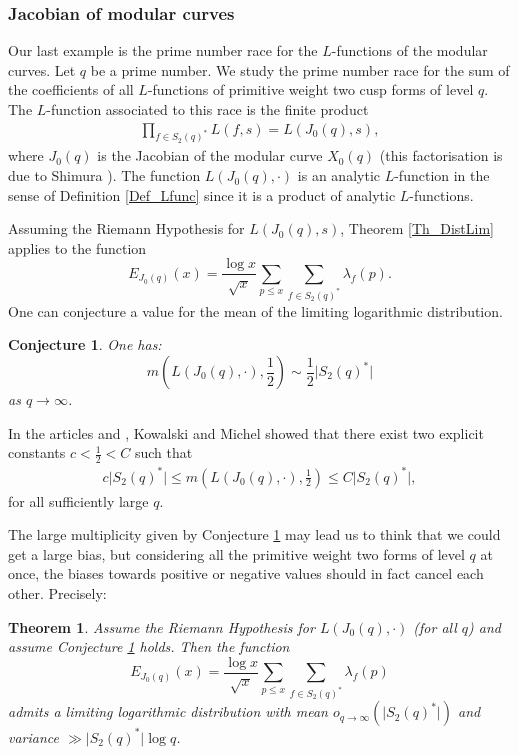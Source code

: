 \documentclass[a4paper,10pt]{amsart}
\theoremstyle{plain}
\newtheorem{conj}{Conjecture}
\newtheorem{theo}{Theorem}[section]
\theoremstyle{definition}
\begin{document}
\subsubsection{Jacobian of modular curves}

Our last example is the prime number race for the $L$-functions of the modular curves.
Let $q$ be a prime number.
We study the prime number race for the sum of the coefficients of all $L$-functions of primitive weight two cusp forms of level $q$.
The $L$-function associated to this race is the finite product
\begin{align*}
\prod_{f\in S_{2}(q)^{*}}L(f,s) = L(J_{0}(q),s),
\end{align*} 
where $J_{0}(q)$ is the Jacobian of the modular curve $X_{0}(q)$ (this factorisation is due to Shimura \cite{Shimura}).
The function $L(J_{0}(q),\cdot)$ is an analytic $L$-function in the sense of Definition \ref{Def_Lfunc}
since it is a product of analytic $L$-functions.

Assuming the Riemann Hypothesis for $L(J_{0}(q),s)$, Theorem \ref{Th_DistLim} applies to the function
$$E_{J_{0}(q)}(x) = \frac{\log x}{\sqrt{x}}\sum_{p\leq x}\sum_{f\in S_{2}(q)^{*}} \lambda_{f}(p).$$
One can conjecture a value for the mean of the limiting logarithmic distribution.
\begin{conj}\label{Conj_largeRank}
One has:
$$m\left(L(J_{0}(q),\cdot),\frac{1}{2}\right) \sim \frac{1}{2}\lvert S_{2}(q)^{*} \rvert$$
as $q\rightarrow \infty$.
\end{conj}
In the articles \cite{KM_upperbound} and \cite{KM_lowerbound}, 
Kowalski and Michel showed that there exist two explicit constants $c<\frac{1}{2}<C$ such that
\begin{align*}
c\lvert S_{2}(q)^{*} \rvert\leq  m(L(J_{0}(q),\cdot),\frac{1}{2}) \leq C\lvert S_{2}(q)^{*} \rvert,
\end{align*}
for all sufficiently large $q$.

The large multiplicity given by Conjecture \ref{Conj_largeRank} may lead us to think that we could get a large bias, but considering all the primitive weight two forms of level $q$ at once, the biases towards positive or negative values should in fact cancel each other.
Precisely:
\begin{theo}\label{Prop_JacModCurve}
Assume the Riemann Hypothesis for $L(J_{0}(q),\cdot)$ (for all $q$)
and assume Conjecture \ref{Conj_largeRank} holds.
Then the function 
$$E_{J_{0}(q)}(x) = \frac{\log x}{\sqrt{x}}\sum_{p\leq x}\sum_{f\in S_{2}(q)^{*}} \lambda_{f}(p)$$
admits a limiting logarithmic distribution
with mean $o_{q\rightarrow\infty}(\lvert S_{2}(q)^{*} \rvert)$
and variance $\gg \lvert S_{2}(q)^{*} \rvert \log q$.
\end{theo}
\end{document}
